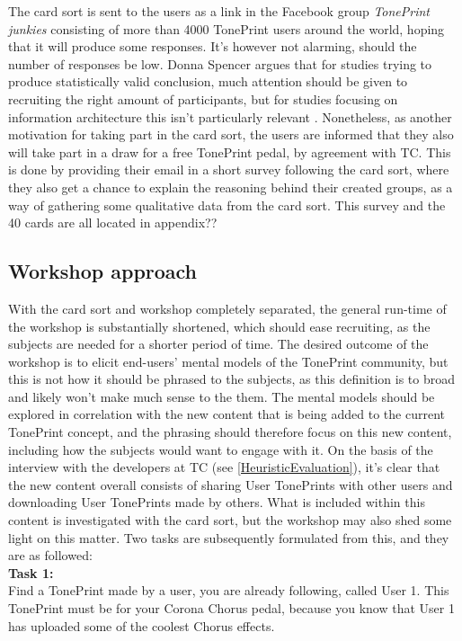 The card sort is sent to the users as a link in the Facebook group \textit{TonePrint junkies} consisting of more than 4000 TonePrint users around the world, hoping that it will produce some responses. It's however not alarming, should the number of responses be low. Donna Spencer argues that for studies trying to produce statistically valid conclusion, much attention should be given to recruiting the right amount of participants, but for studies focusing on information architecture this isn't particularly relevant \parencite[][130]{WEB:DonnaSpencer}. Nonetheless, as another motivation for taking part in the card sort, the users are informed that they also will take part in a draw for a free TonePrint pedal, by agreement with TC. This is done by providing their email in a short survey following the card sort, where they also get a chance to explain the reasoning behind their created groups, as a way of gathering some qualitative data from the card sort. This survey and the 40 cards are all located in appendix?? 

\subsection{Workshop approach}
\label{WorkshopApproach}
With the card sort and workshop completely separated, the general run-time of the workshop is substantially shortened, which should ease recruiting, as the subjects are needed for a shorter period of time. The desired outcome of the workshop is to elicit end-users' mental models of the TonePrint community, but this is not how it should be phrased to the subjects, as this definition is to broad and likely won't make much sense to the them. The mental models should be explored in correlation with the new content that is being added to the current TonePrint concept, and the phrasing should therefore focus on this new content, including how the subjects would want to engage with it. On the basis of the interview with the developers at TC (see \autoref{HeuristicEvaluation}), it's clear that the new content overall consists of sharing User TonePrints with other users and downloading User TonePrints made by others. What is included within this content is investigated with the card sort, but the workshop may also shed some light on this matter. Two tasks are subsequently formulated from this, and they are as followed: \\

\noindent
\textbf{Task 1:}\\
\noindent
Find a TonePrint made by a user, you are already following, called User 1. This TonePrint must be for your Corona Chorus pedal, because you know that User 1 has uploaded some of the coolest Chorus effects. \\

